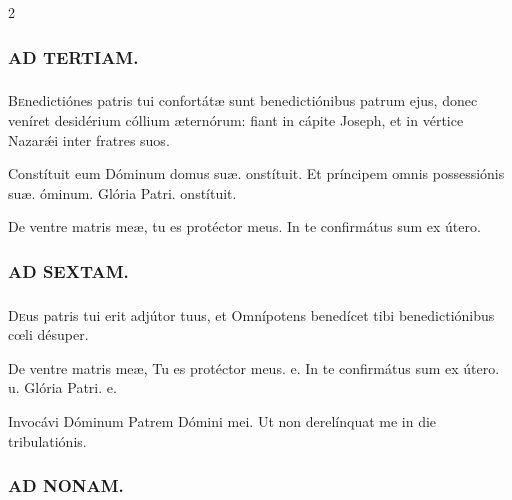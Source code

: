 \documentclass[9pt,twoside]{extarticle}
\begin{document}
\begin{multicols}{2}
\begin{tightlist}{}
\item {}
\end{tightlist}

\subsubsection*{\center \textsc{AD TERTIAM.}}
\subsubsection*{}
\lettrine{B}enedictiónes patris tui confortátæ sunt benedictiónibus patrum ejus, donec veníret desidérium cóllium æternórum: fiant in cápite Joseph, et in vértice Nazarǽi inter fratres suos.

\begin{tightlist}{}
\item {} Constítuit eum \textred{*} Dóminum domus suæ. onstítuit.  Et príncipem omnis possessiónis suæ. óminum. Glória Patri. onstítuit.
\item {} De ventre matris meæ, tu es protéctor meus.  In te confirmátus sum ex útero.
\end{tightlist}

\subsubsection*{\center \textsc{AD SEXTAM.}}
\subsubsection*{}
\lettrine{D}eus patris tui erit adjútor tuus, et Omnípotens benedícet tibi benedictiónibus cœli désuper.

\begin{tightlist}{}
\item {} De ventre matris meæ, \textred{*} Tu es protéctor meus. e.  In te confirmátus sum ex útero. u. Glória Patri. e.
\item {} Invocávi Dóminum Patrem Dómini mei.  Ut non derelínquat me in die tribulatiónis.
\end{tightlist}

\subsubsection*{\center \textsc{AD NONAM.}}

\end{multicols}
\end{document}
